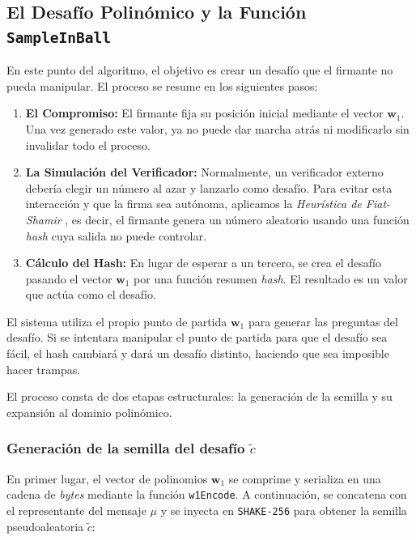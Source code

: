\documentclass[11pt, a4paper]{report}
\theoremstyle{definition}
\begin{document}
\subsection{El Desafío Polinómico y la Función \texttt{SampleInBall}}

En este punto del algoritmo, el objetivo es crear un desafío que el firmante no pueda manipular. El proceso se resume en los siguientes pasos:

\begin{enumerate}
    \item \textbf{El Compromiso:} El firmante fija su posición inicial mediante el vector $\mathbf{w}_1$. Una vez generado este valor, ya no puede dar marcha atrás ni modificarlo sin invalidar todo el proceso.
    
    \item \textbf{La Simulación del Verificador:} Normalmente, un verificador externo debería elegir un número al azar y lanzarlo como desafío. Para evitar esta interacción y que la firma sea autónoma, aplicamos la \textit{Heurística de Fiat-Shamir} \cite{lyubashevsky2009fiat}, es decir, el firmante genera un número aleatorio usando una función \textit{hash} cuya salida no puede controlar.
    
    \item \textbf{Cálculo del Hash:} En lugar de esperar a un tercero, se crea el desafío pasando el vector $\mathbf{w}_1$ por una función resumen \textit{hash}. El resultado es un valor que actúa como el desafío.
\end{enumerate}

El sistema utiliza el propio punto de partida $\mathbf{w}_1$ para generar las preguntas del desafío. Si se intentara manipular el punto de partida para que el desafío sea fácil, el hash cambiará y dará un desafío distinto, haciendo que sea imposible hacer trampas.

El proceso consta de dos etapas estructurales: la generación de la semilla y su expansión al dominio polinómico.

\subsubsection{Generación de la semilla del desafío $\tilde{c}$}
En primer lugar, el vector de polinomios $\mathbf{w}_1$ se comprime y serializa en una cadena de \textit{bytes} mediante la función \texttt{w1Encode}. A continuación, se concatena con el representante del mensaje $\mu$ y se inyecta en \texttt{SHAKE-256} para obtener la semilla pseudoaleatoria $\tilde{c}$:
\end{document}
